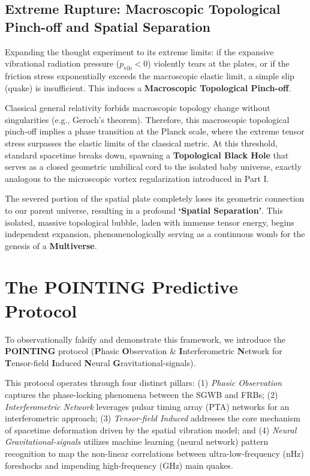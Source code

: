 \documentclass[reprint,amsmath,amssymb,aps,prd]{revtex4-2}
\begin{document}
\subsection{Extreme Rupture: Macroscopic Topological Pinch-off and Spatial Separation}
Expanding the thought experiment to its extreme limits: if the expansive vibrational radiation pressure ($p_{\mathrm{vib}} < 0$) violently tears at the plates, or if the friction stress exponentially exceeds the macroscopic elastic limit, a simple slip (quake) is insufficient. This induces a \textbf{Macroscopic Topological Pinch-off}.

Classical general relativity forbids macroscopic topology change without singularities (e.g., Geroch's theorem). Therefore, this macroscopic topological pinch-off implies a phase transition at the Planck scale, where the extreme tensor stress surpasses the elastic limits of the classical metric. At this threshold, standard spacetime breaks down, spawning a \textbf{Topological Black Hole} that serves as a closed geometric umbilical cord to the isolated baby universe, exactly analogous to the microscopic vortex regularization introduced in Part I.

The severed portion of the spatial plate completely loses its geometric connection to our parent universe, resulting in a profound \textbf{`Spatial Separation'}. This isolated, massive topological bubble, laden with immense tensor energy, begins independent expansion, phenomenologically serving as a continuous womb for the genesis of a \textbf{Multiverse}.

\section{The POINTING Predictive Protocol}
To observationally falsify and demonstrate this framework, we introduce the \textbf{POINTING} protocol (\textbf{P}hasic \textbf{O}bservation \& \textbf{I}nterferometric \textbf{N}etwork for \textbf{T}ensor-field \textbf{I}nduced \textbf{N}eural \textbf{G}ravitational-signals). 

This protocol operates through four distinct pillars: (1) \textit{Phasic Observation} captures the phase-locking phenomena between the SGWB and FRBs; (2) \textit{Interferometric Network} leverages pulsar timing array (PTA) networks \cite{Agazie2023} for an interferometric approach; (3) \textit{Tensor-field Induced} addresses the core mechanism of spacetime deformation driven by the spatial vibration model; and (4) \textit{Neural Gravitational-signals} utilizes machine learning (neural network) pattern recognition to map the non-linear correlations between ultra-low-frequency (nHz) foreshocks and impending high-frequency (GHz) main quakes.
\end{document}
